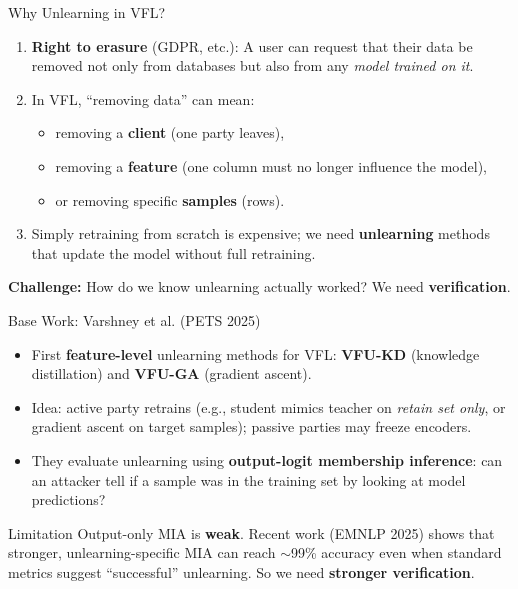 \documentclass[11pt,aspectratio=169]{beamer}
\begin{document}
\begin{frame}{Why Unlearning in VFL?}
  \begin{enumerate}
    \item \textbf{Right to erasure} (GDPR, etc.): A user can request that their data be removed not only from databases but also from any \emph{model trained on it}.
    \item In VFL, ``removing data'' can mean:
      \begin{itemize}
        \item removing a \textbf{client} (one party leaves),
        \item removing a \textbf{feature} (one column must no longer influence the model),
        \item or removing specific \textbf{samples} (rows).
      \end{itemize}
    \item Simply retraining from scratch is expensive; we need \textbf{unlearning} methods that update the model without full retraining.
  \end{enumerate}
  \vspace{0.5em}
  \textbf{Challenge:} How do we know unlearning actually worked? We need \textbf{verification}.
\end{frame}

\begin{frame}{Base Work: Varshney et al. (PETS 2025)}
  \begin{itemize}
    \item First \textbf{feature-level} unlearning methods for VFL: \textbf{VFU-KD} (knowledge distillation) and \textbf{VFU-GA} (gradient ascent).
    \item Idea: active party retrains (e.g., student mimics teacher on \emph{retain set only}, or gradient ascent on target samples); passive parties may freeze encoders.
    \item They evaluate unlearning using \textbf{output-logit membership inference}: can an attacker tell if a sample was in the training set by looking at model predictions?
  \end{itemize}
  \vspace{0.5em}
  \begin{alertblock}{Limitation}
    Output-only MIA is \textbf{weak}. Recent work (EMNLP 2025) shows that stronger, unlearning-specific MIA can reach $\sim$99\% accuracy even when standard metrics suggest ``successful'' unlearning. So we need \textbf{stronger verification}.
  \end{alertblock}
\end{frame}
\end{document}
